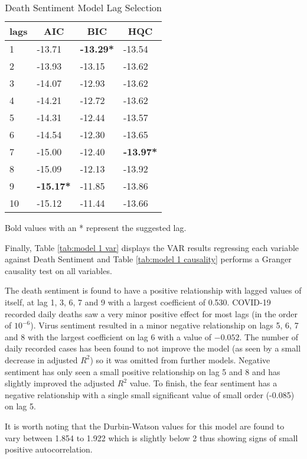 \begin{table}[H]
\centering
\begin{tabular}{@{}llll@{}}
\toprule
\multicolumn{1}{c}{\textbf{lags}} & \multicolumn{1}{c}{\textbf{AIC}} & \multicolumn{1}{c}{\textbf{BIC}} & \multicolumn{1}{c}{\textbf{HQC}} \\ \midrule
1 & -13.71 & \textbf{-13.29*} & -13.54 \\
2 & -13.93 & -13.15 & -13.62 \\
3 & -14.07 & -12.93 & -13.62 \\
4 & -14.21 & -12.72 & -13.62 \\
5 & -14.31 & -12.44 & -13.57 \\
6 & -14.54 & -12.30 & -13.65 \\
7 & -15.00 & -12.40 & \textbf{-13.97*} \\
8 & -15.09 & -12.13 & -13.92 \\
9 & \textbf{-15.17*} & -11.85 & -13.86 \\
10 & -15.12 & -11.44 & -13.66 \\ \bottomrule
\end{tabular}
\caption{Death Sentiment Model Lag Selection}
\label{tab:model 1 lag}
Bold values with an * represent the suggested lag.
\end{table}

Finally, Table \ref{tab:model 1 var} displays the VAR results regressing each variable against Death Sentiment and Table \ref{tab:model 1 causality} performs a Granger causality test on all variables.

The death sentiment is found to have a positive relationship with lagged values of itself, at lag 1, 3, 6, 7 and 9 with a largest coefficient of 0.530. COVID-19 recorded daily deaths saw a very minor positive effect for most lags (in the order of $10^{-6}$). Virus sentiment resulted in a minor negative relationship on lags 5, 6, 7 and 8 with the largest coefficient on lag 6 with a value of $-0.052$. The number of daily recorded cases has been found to not improve the model (as seen by a small decrease in adjusted $R^{2}$) so it was omitted from further models. Negative sentiment has only seen a small positive relationship on lag 5 and 8 and has slightly improved the adjusted $R^2$ value. To finish, the fear sentiment has a negative relationship with a single small significant value of small order (-0.085) on lag 5.

It is worth noting that the Durbin-Watson values for this model are found to vary between 1.854 to 1.922 which is slightly below 2 thus showing signs of small positive autocorrelation. 

